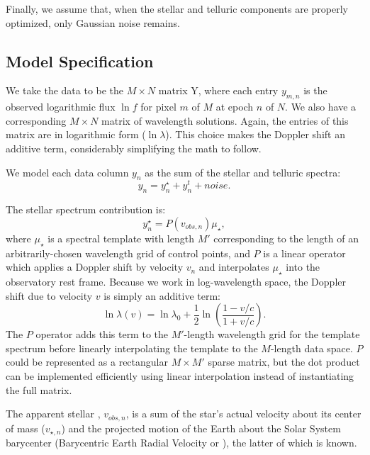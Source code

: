 \documentclass[modern]{aastex62}
\begin{document}
Finally, we assume that, when the stellar and telluric components are properly optimized, only Gaussian noise remains.

\subsection{Model Specification}
\label{s:model-eqns}

We take the data to be the $M \times N$ matrix Y, where each entry $y_{m,n}$ is the observed logarithmic flux $\ln f$ for pixel $m$ of $M$ at epoch $n$ of $N$.
We also have a corresponding $M \times N$ matrix of wavelength solutions.
Again, the entries of this matrix are in logarithmic form ($\ln \lambda$).
This choice makes the Doppler shift an additive term, considerably simplifying the math to follow.

We model each data column $y_n$ as the sum of the stellar and telluric spectra:
\begin{equation}
y_n = y_{n}^\star + y_{n}^t + noise.
\end{equation}

The stellar spectrum contribution is:
\begin{equation}
y_{n}^\star = P(v_{obs, n}) \mu_{\star},
\end{equation}
where $\mu_{\star}$ is a spectral template with length $M'$ corresponding to
the length of an arbitrarily-chosen wavelength grid of control points, and
$P$ is a linear operator which applies a Doppler shift by velocity $v_n$ and
interpolates $\mu_\star$ into the observatory rest frame.
Because we work in log-wavelength space, the Doppler shift due to velocity $v$ is simply an additive term:
\begin{equation}
 \ln \lambda(v) = \ln \lambda_{0} + \frac{1}{2} \ln \left(\frac{1 - v/c}{1 + v/c}\right).
\end{equation}
The $P$ operator adds this term to the $M'$-length wavelength grid for the template spectrum before linearly interpolating the template to the $M$-length data space.
 $P$ could be represented as a rectangular
$M \times M'$ sparse matrix, but the dot product can be implemented
efficiently using linear interpolation instead of instantiating the full matrix.

The apparent stellar \RV, $v_{obs, n}$, is a sum of the star's actual velocity about its center of mass ($v_{\star, n}$) and the projected motion of the Earth about the Solar System barycenter (Barycentric Earth Radial Velocity or \BERV), the latter of which is known.
\end{document}
